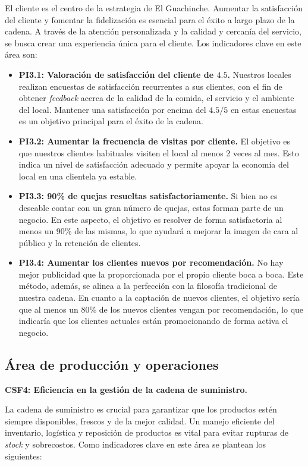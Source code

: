 \documentclass[12pt]{opticajnl}
\begin{document}
El cliente es el centro de la estrategia de El Guachinche. Aumentar la satisfacción del cliente y fomentar la fidelización es esencial para el éxito a largo plazo de la cadena. A través de la atención personalizada y la calidad y cercanía del servicio, se busca crear una experiencia única para el cliente. Los indicadores clave en este área son:

\begin{itemize}
    \item \textbf{PI3.1: Valoración de satisfacción del cliente de $4.5$.} Nuestros locales realizan encuestas de satisfacción recurrentes a sus clientes, con el fin de obtener \textit{feedback} acerca de la calidad de la comida, el servicio y el ambiente del local. Mantener una satisfacción por encima del $4.5/5$ en estas encuestas es un objetivo principal para el éxito de la cadena.
    \item \textbf{PI3.2: Aumentar la frecuencia de visitas por cliente.} El objetivo es que nuestros clientes habituales visiten el local al menos 2 veces al mes. Esto indica un nivel de satisfacción adecuado y permite apoyar la economía del local en una clientela ya estable.
    \item \textbf{PI3.3: 90\% de quejas resueltas satisfactoriamente.} Si bien no es deseable contar con un gran número de quejas, estas forman parte de un negocio. En este aspecto, el objetivo es resolver de forma satisfactoria al menos un 90\% de las mismas, lo que ayudará a mejorar la imagen de cara al público y la retención de clientes.
    \item \textbf{PI3.4: Aumentar los clientes nuevos por recomendación.} No hay mejor publicidad que la proporcionada por el propio cliente boca a boca. Este método, además, se alinea a la perfección con la filosofía tradicional de nuestra cadena. En cuanto a la captación de nuevos clientes, el objetivo sería que al menos un 80\% de los nuevos clientes vengan por recomendación, lo que indicaría que los clientes actuales están promocionando de forma activa el negocio.
\end{itemize}

\subsection{Área de producción y operaciones}

\textbf{CSF4: Eficiencia en la gestión de la cadena de suministro.}

La cadena de suministro es crucial para garantizar que los productos estén siempre disponibles, frescos y de la mejor calidad. Un manejo eficiente del inventario, logística y reposición de productos es vital para evitar rupturas de \textit{stock} y sobrecostos. Como indicadores clave en este área se plantean los siguientes:
\end{document}

